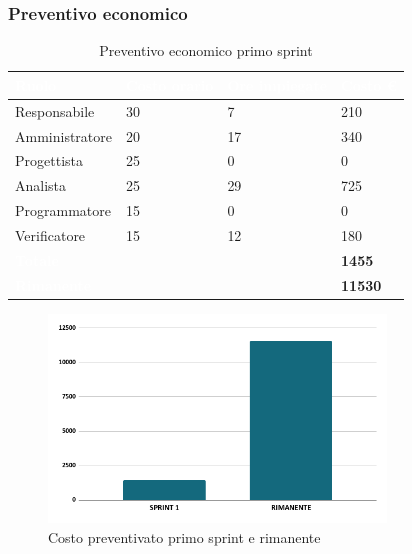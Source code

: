 \newpage

\subsubsection{Preventivo economico}

{
\setlength{\tabcolsep}{10pt}
\renewcommand{\arraystretch}{1.5}
\begin{table}[h]
    \centering
    \begin{tabularx}{\textwidth}{| l | l | l | X |}
        \hline
        \rowcolor{headerrow} \textbf{\textcolor{white}{Ruolo}} & \textbf{\textcolor{white}{Costo orario}} & \textbf{\textcolor{white}{Ore impiegate}} & \textbf{\textcolor{white}{Costo €}} \\
        \hline
        Responsabile & 30 & 7 & 210\\
        \hline
        Amministratore & 20 & 17  & 340\\
        \hline
        Progettista& 25 & 0  & 0\\
        \hline
        Analista & 25 & 29  & 725\\
        \hline
        Programmatore & 15 & 0  & 0\\
        \hline
        Verificatore & 15 & 12  & 180\\
        \hline
        \cellcolor{headerrow} \textbf{\textcolor{white}{Totale}} &  &  & \textbf{1455}\\
        \hline
        \cellcolor{headerrow} \textbf{\textcolor{white}{Rimanente}} &  &  & \textbf{11530}\\
        \hline
    \end{tabularx}
    \caption{Preventivo economico primo sprint}
    \label{tab:preventivocostiprimosprint}
\end{table}
}
{
\begin{figure}[h!]
    \centering
    \includegraphics[width=0.8\textwidth]{prev1costo.png}
    \caption{Costo preventivato primo sprint e rimanente}
    \label{fig:preventivocostoprimosprint}
\end{figure}
}

